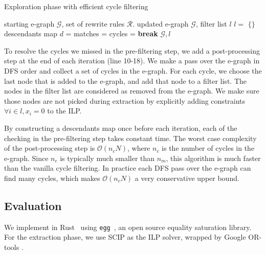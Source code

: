 \begin{algorithm}[t]
\small
\caption{Exploration phase with efficient cycle filtering}
\label{alg:cycle}
\begin{algorithmic}[1]
\Require starting e-graph $\mathcal{G}$, set of rewrite rules $\mathcal{R}$.
\Ensure updated e-graph $\mathcal{G}$, filter list $l$
  \State $l = $ $\{\}$
    \State descendants map $d$ = 
    \State matches = 
        \State {}
      \EndIf
    \EndFor
      \State cycles = 
        \State \textbf{break}
      \EndIf
        \State {}
      \EndFor
    \EndWhile
  \EndFor
  \State \Return $\mathcal{G}, l$
\end{algorithmic}
\end{algorithm}

To resolve the cycles we missed in the pre-filtering step, we add a post-processing step at the end of each iteration (line 10-18).
We make a pass over the e-graph in DFS order and collect a set of cycles in the e-graph.
For each cycle, we choose the last node that is added to the e-graph, and add that node to a filter list.
The nodes in the filter list are considered as removed from the e-graph.
We make sure those nodes are not picked during extraction by explicitly adding constraints $\forall i \in l, x_i = 0$ to the ILP.

By constructing a descendants map once before each iteration, each of the checking in the pre-filtering step takes constant time.
The worst case complexity of the post-processing step is $\mathcal{O}(n_c N)$, where $n_c$ is the number of cycles in the e-graph.
Since $n_c$ is typically much smaller than $n_m$, this algorithm is much faster than the vanilla cycle filtering.
In practice each DFS pass over the e-graph can find many cycles, which makes $\mathcal{O}(n_c N)$ a very conservative upper bound.

\subsection{Evaluation}

We implement \ourname{} in Rust~\cite{rust} using \texttt{egg}~\cite{egg}, an open source equality saturation library.
For the extraction phase, we use SCIP \cite{scip} as the ILP solver, wrapped by Google OR-tools \cite{ortools}.

